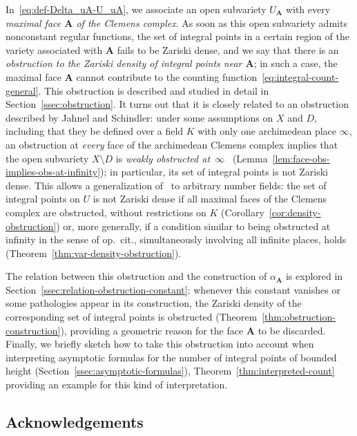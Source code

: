 \documentclass[a4paper, twoside, 10pt]{amsart}
\newcommand{\uA}{{\boldsymbol{A}}}
\theoremstyle{definition}
\DeclareRobustCommand{\SkipTocEntry}[5]{}
\DeclareRobustCommand{\SkipTocEntry}[4]{}
\begin{document}
In~\eqref{eq:def-Delta_uA-U_uA}, we associate an open subvariety $U_\uA$ with every \emph{maximal face $\uA$ of the Clemens complex}. As soon as this open subvariety admits nonconstant regular functions, the set of integral points in a certain region of the variety associated with $\uA$ fails to be Zariski dense, and we say that there is an \emph{obstruction to the Zariski density of integral points near $\uA$};
in such a case, the maximal face $\uA$ cannot contribute to the counting function~\eqref{eq:integral-count-general}.
This obstruction is described and studied in detail in Section~\ref{ssec:obstruction}.
It turns out that it is closely related to an obstruction described by Jahnel and Schindler: under some assumptions on $X$ and $D$, including that they be defined over a field $K$ with only one archimedean place $\infty$, an obstruction at \emph{every} face of the archimedean Clemens complex implies that the open subvariety $X\setminus D$ is \emph{weakly obstructed at~$\infty$}~\cite[Def.~2.2~(ii--iii)]{MR3736498} (Lemma~\ref{lem:face-obs-implies-obs-at-infinity}); in particular, its set of integral points is not Zariski dense. This allows a generalization of~\cite[Thm.~2.6]{MR3736498} to arbitrary number fields: the set of integral points on $U$ is not Zariski dense if all maximal faces of the Clemens complex are obstructed, without restrictions on $K$ (Corollary~\ref{cor:density-obstruction}) or, more generally, if a condition similar to being obstructed at infinity in the sense of op.~cit., simultaneously involving all infinite places, holds (Theorem~\ref{thm:var-density-obstruction}).

The relation between this obstruction and the construction of $\alpha_\uA$ is explored in Section~\ref{ssec:relation-obstruction-constant}: whenever this constant vanishes or some pathologies appear in its construction, the Zariski density of the corresponding set of integral points is obstructed (Theorem~\ref{thm:obstruction-construction}), providing a geometric reason for the face $\uA$ to be discarded. Finally, we briefly sketch how to take this obstruction into account when interpreting asymptotic formulas for the number of integral points of bounded height (Section~\ref{ssec:asymptotic-formulas}), Theorem~\ref{thm:interpreted-count} providing an example for this kind of interpretation.


\subsection*{Acknowledgements}
\end{document}
